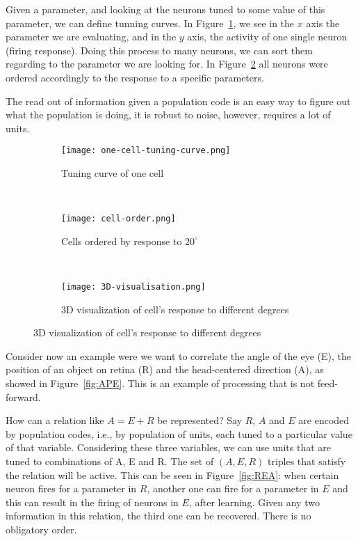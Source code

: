 \documentclass[main]{subfiles}
\begin{document}
Given a parameter, and looking at the neurons tuned to some value of this parameter, we can define tunning curves.
In Figure~\ref{fig:tuning-curve}, we see in the $x$ axis the parameter we are evaluating, and in the $y$ axis, the activity of one single neuron (firing response).
Doing this process to many neurons, we can sort them regarding to the parameter we are looking for.
In Figure~\ref{fig:cell-order} all neurons were ordered accordingly to the response to a specific parameters.

The read out of information given a population code is an easy way to figure out what the population is doing, it is robust to noise, however, requires a lot of units.

\begin{figure}[H]
	\centering
	\begin{subfigure}[b]{0.3\textwidth}
		\centering
		\texttt{[image: one-cell-tuning-curve.png]}
		\caption{Tuning curve of one cell}
		\label{fig:tuning-curve}
	\end{subfigure}%
	~
	\begin{subfigure}[b]{0.3\textwidth}
		\centering
		\texttt{[image: cell-order.png]}
		\caption{Cells ordered by response to $20^\circ$}
		\label{fig:cell-order}
	\end{subfigure}
	~ 
	\begin{subfigure}[b]{0.3\textwidth}
		\centering
		\texttt{[image: 3D-visualisation.png]}
		\caption{3D visualization of cell's response to different degrees}
		\label{fig:3d}
	\end{subfigure}
\end{figure}

Consider now an example were we want to correlate the angle of the eye (E), the position of an object on retina (R) and the head-centered direction (A), as showed in Figure~\ref{fig:APE}.
This is an example of processing that is not feed-forward.

How can a relation like $A = E + R$ be represented?
Say $R$, $A$ and $E$ are encoded by population codes, i.e., by population of units, each tuned to a particular value of that variable.
Considering these three variables, we can use units that are tuned to combinations of A, E and R.
The set of $(A, E, R)$ triples that satisfy the relation will be active.
This can be seen in Figure~\ref{fig:REA}: when certain neuron fires for a parameter in $R$, another one can fire for a parameter in $E$ and this can result in the firing of neurons in $E$, after learning.
Given any two information in this relation, the third one can be recovered.
There is no obligatory order.
\end{document}
